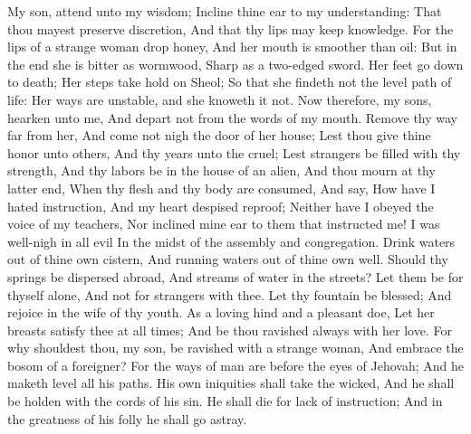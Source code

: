 My son, attend unto my wisdom; Incline thine ear to my understanding:  That thou mayest preserve discretion, And that thy lips may keep knowledge.  For the lips of a strange woman drop honey, And her mouth is smoother than oil:  But in the end she is bitter as wormwood, Sharp as a two-edged sword.  Her feet go down to death; Her steps take hold on Sheol;  So that she findeth not the level path of life: Her ways are unstable, and she knoweth it not.  Now therefore, my sons, hearken unto me, And depart not from the words of my mouth.  Remove thy way far from her, And come not nigh the door of her house;  Lest thou give thine honor unto others, And thy years unto the cruel;  Lest strangers be filled with thy strength, And thy labors be in the house of an alien,  And thou mourn at thy latter end, When thy flesh and thy body are consumed,  And say, How have I hated instruction, And my heart despised reproof;  Neither have I obeyed the voice of my teachers, Nor inclined mine ear to them that instructed me!  I was well-nigh in all evil In the midst of the assembly and congregation.  Drink waters out of thine own cistern, And running waters out of thine own well.  Should thy springs be dispersed abroad, And streams of water in the streets?  Let them be for thyself alone, And not for strangers with thee.  Let thy fountain be blessed; And rejoice in the wife of thy youth.  As a loving hind and a pleasant doe, Let her breasts satisfy thee at all times; And be thou ravished always with her love.  For why shouldest thou, my son, be ravished with a strange woman, And embrace the bosom of a foreigner?  For the ways of man are before the eyes of Jehovah; And he maketh level all his paths.  His own iniquities shall take the wicked, And he shall be holden with the cords of his sin.  He shall die for lack of instruction; And in the greatness of his folly he shall go astray. 

